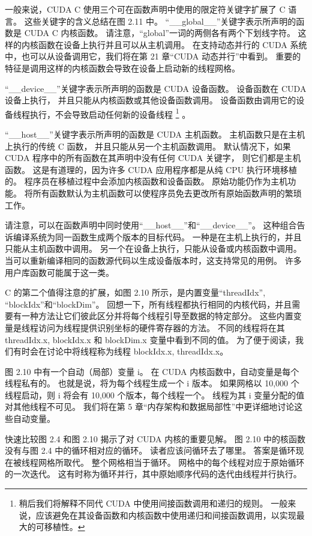 一般来说，CUDA C 使用三个可在函数声明中使用的限定符关键字扩展了 C 语言。 
这些关键字的含义总结在图 2.11 中。 “\_\_global\_\_”关键字表示所声明的函数是 CUDA C 内核函数。 
请注意，“global”一词的两侧各有两个下划线字符。 这样的内核函数在设备上执行并且可以从主机调用。 
在支持动态并行的 CUDA 系统中，也可以从设备调用它，我们将在第 21 章“CUDA 动态并行”中看到。 
重要的特征是调用这样的内核函数会导致在设备上启动新的线程网格。

“\_\_device\_\_”关键字表示所声明的函数是 CUDA 设备函数。 设备函数在 CUDA 设备上执行，
并且只能从内核函数或其他设备函数调用。 设备函数由调用它的设备线程执行，不会导致启动任何新的设备线程
\footnote{稍后我们将解释不同代 CUDA 中使用间接函数调用和递归的规则。 
一般来说，应该避免在其设备函数和内核函数中使用递归和间接函数调用，以实现最大的可移植性。} 。

“\_\_host\_\_”关键字表示所声明的函数是 CUDA 主机函数。 主机函数只是在主机上执行的传统 C 函数，
并且只能从另一个主机函数调用。 默认情况下，如果 CUDA 程序中的所有函数在其声明中没有任何 CUDA 关键字，
则它们都是主机函数。 这是有道理的，因为许多 CUDA 应用程序都是从纯 CPU 执行环境移植的。 
程序员在移植过程中会添加内核函数和设备函数。 原始功能仍作为主机功能。 
将所有函数默认为主机函数可以使程序员免去更改所有原始函数声明的繁琐工作。

请注意，可以在函数声明中同时使用“\_\_host\_\_”和“\_\_device\_\_”。 
这种组合告诉编译系统为同一函数生成两个版本的目标代码。 一种是在主机上执行的，并且只能从主机函数中调用。 
另一个在设备上执行，只能从设备或内核函数中调用。 当可以重新编译相同的函数源代码以生成设备版本时，这支持常见的用例。 
许多用户库函数可能属于这一类。

C 的第二个值得注意的扩展，如图 2.10 所示，是内置变量“threadIdx”, “blockIdx”和“blockDim”。 
回想一下，所有线程都执行相同的内核代码，并且需要有一种方法让它们彼此区分并将每个线程引导至数据的特定部分。 
这些内置变量是线程访问为线程提供识别坐标的硬件寄存器的方法。 
不同的线程将在其 threadIdx.x, blockIdx.x 和 blockDim.x 变量中看到不同的值。 
为了便于阅读，我们有时会在讨论中将线程称为线程 blockIdx.x, threadIdx.x。

图 2.10 中有一个自动（局部）变量 i。 在 CUDA 内核函数中，自动变量是每个线程私有的。 
也就是说，将为每个线程生成一个 i 版本。 如果网格以 10,000 个线程启动，则 i 将会有 10,000 个版本，每个线程一个。 
线程为其 i 变量分配的值对其他线程不可见。 我们将在第 5 章“内存架构和数据局部性”中更详细地讨论这些自动变量。

快速比较图 2.4 和图 2.10 揭示了对 CUDA 内核的重要见解。 图 2.10 中的核函数没有与图 2.4 中的循环相对应的循环。 
读者应该问循环去了哪里。 答案是循环现在被线程网格所取代。 整个网格相当于循环。 网格中的每个线程对应于原始循环的一次迭代。 
这有时称为循环并行，其中原始顺序代码的迭代由线程并行执行。

